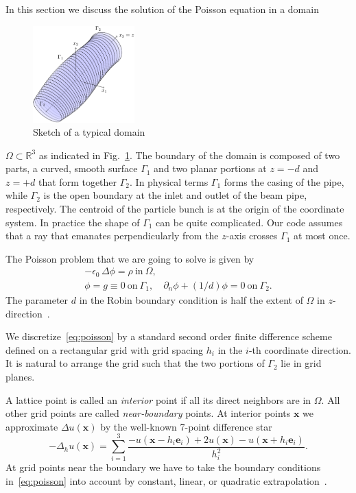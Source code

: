 \documentclass[oribibl]{llncs}
\renewcommand{\Re}{\mathbb{R}}
\begin{document}
In this section we discuss the solution of the Poisson equation in a
domain 
\begin{figure}[htb]
  \centering
  \includegraphics[width=0.35\textwidth]{figbound.pdf}
  \caption{Sketch of a typical domain}
  \label{fig:domain}
\end{figure}
$\Omega \subset \Re^3$ as indicated in Fig.~\ref{fig:domain}.  The
boundary of the domain is composed of two parts, a curved, smooth
surface $\Gamma_1$ and two planar portions at $z=-d$ and $z=+d$ that
form together $\Gamma_2$.  In physical terms $\Gamma_1$ forms the casing
of the pipe, while $\Gamma_2$ is the open boundary at the inlet and
outlet of the beam pipe, respectively.  The centroid of the particle
bunch is at the origin of the coordinate system.  In practice the shape
of $\Gamma_1$ can be quite complicated.  Our code assumes that a ray
that emanates perpendicularly from the $z$-axis crosses $\Gamma_1$ at
most once.

The Poisson problem that we are going to solve is given by
\begin{equation} \label{eq:poisson}
  \begin{gathered}
    -\epsilon_0\, \Delta \phi = \rho\ \text{in}\ \Omega, \\
    \phi = g \equiv 0\ \text{on}\ \Gamma_1, \quad
    \partial_n{\phi} +  (1/d) \phi = 0\
    \text{on}\ \Gamma_2.
  \end{gathered}
\end{equation}
The parameter $d$ in the Robin boundary condition is half the extent of
$\Omega$ in $z$-direction~\cite{poplau_self-adaptive_2008}.

We discretize~\eqref{eq:poisson} by a standard second order finite
difference scheme defined on a rectangular grid with grid spacing $h_i$
in the $i$-th coordinate direction.  It is natural to arrange the grid
such that the two portions of $\Gamma_2$ lie in grid planes.

A lattice point is called an \emph{interior} point if all its direct
neighbors are in $\Omega$.  All other grid points are called
\emph{near-boundary} points.  At interior points $\mathbf{x}$ we
approximate $\Delta u (\mathbf{x})$ by the well-known 7-point difference
star
\begin{equation}  \label{eq:7pt-star}
  -\Delta_h u(\mathbf{x}) = 
  \sum_{i=1}^3
  \frac{-u(\mathbf{x}\!-\!h_i\mathbf{e}_i) + 2 u(\mathbf{x})
  - u(\mathbf{x}\!+\!h_i\mathbf{e}_i)}{h_i^2}.
\end{equation}
At grid points near the boundary we have to take the boundary conditions
in~\eqref{eq:poisson} into account by constant, linear, or quadratic
extrapolation~\cite{adai:10, fowa:60, mcgv:04}.
\end{document}
